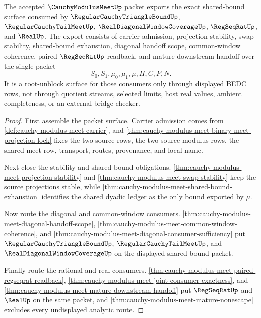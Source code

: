 \begin{theorem}
\label{thm:cauchy-modulus-meet-root-unblock-export}
The accepted $\CauchyModulusMeetUp$ packet exports the exact shared-bound surface consumed by $\RegularCauchyTriangleBoundUp$, $\RegularCauchyTailMeetUp$, $\RealDiagonalWindowCoverageUp$, $\RegSeqRatUp$, and $\RealUp$. The export consists of carrier admission, projection stability, swap stability, shared-bound exhaustion, diagonal handoff scope, common-window coherence, paired $\RegSeqRatUp$ readback, and mature downstream handoff over the single packet
$$
S_0,S_1,\mu_0,\mu_1,\mu,H,C,P,N.
$$
It is a root-unblock surface for those consumers only through displayed BEDC rows, not through quotient streams, selected limits, host real values, ambient completeness, or an external bridge checker.
\end{theorem}
\begin{proof}
First assemble the packet surface. Carrier admission comes from \autoref{def:cauchy-modulus-meet-carrier}, and \autoref{thm:cauchy-modulus-meet-binary-meet-projection-lock} fixes the two source rows, the two source modulus rows, the shared meet row, transport, routes, provenance, and local name.

Next close the stability and shared-bound obligations. \autoref{thm:cauchy-modulus-meet-projection-stability} and \autoref{thm:cauchy-modulus-meet-swap-stability} keep the source projections stable, while \autoref{thm:cauchy-modulus-meet-shared-bound-exhaustion} identifies the shared dyadic ledger as the only bound exported by $\mu$.

Now route the diagonal and common-window consumers. \autoref{thm:cauchy-modulus-meet-diagonal-handoff-scope}, \autoref{thm:cauchy-modulus-meet-common-window-coherence}, and \autoref{thm:cauchy-modulus-meet-diagonal-consumer-sufficiency} put $\RegularCauchyTriangleBoundUp$, $\RegularCauchyTailMeetUp$, and $\RealDiagonalWindowCoverageUp$ on the displayed shared-bound packet.

Finally route the rational and real consumers. \autoref{thm:cauchy-modulus-meet-paired-regseqrat-readback}, \autoref{thm:cauchy-modulus-meet-joint-consumer-exactness}, and \autoref{thm:cauchy-modulus-meet-mature-downstream-handoff} put $\RegSeqRatUp$ and $\RealUp$ on the same packet, and \autoref{thm:cauchy-modulus-meet-mature-nonescape} excludes every undisplayed analytic route.
\end{proof}

